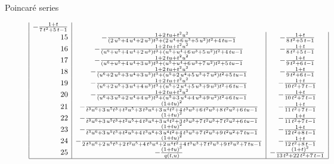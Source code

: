 \documentclass[reqno,10pt]{amsart}
\theoremstyle{definition}
\theoremstyle{remark}
\theoremstyle{plain}
\begin{document}
\begin{section}{Poincar{\'e} series}
\begin{figure}[p]
\begin{center}
\begin{displaymath}
\begin{array}{|r|c|c|}
-{\frac {1+t}{7\,{t}^{2}+5\,t-1}}
\\
15 &
-{\frac {1+2\,tu+{t}^{2}{u}^{2}}{\left (2\,{u}^{5}+4\,{u}^{4}+2\,{u}^{
3}\right ){t}^{3}+\left (2\,{u}^{4}+6\,{u}^{3}+5\,{u}^{2}\right ){t}^{
2}+4\,tu-1}}
&
-{\frac {1+t}{8\,{t}^{2}+5\,t-1}}
\\
16 &
-{\frac {1+2\,tu+{t}^{2}{u}^{2}}{\left ({u}^{6}+{u}^{5}+4\,{u}^{4}+2\,
{u}^{3}\right ){t}^{3}+\left ({u}^{5}+{u}^{4}+6\,{u}^{3}+5\,{u}^{2}
\right ){t}^{2}+4\,tu-1}}
&
-{\frac {1+t}{8\,{t}^{2}+5\,t-1}}
\\
17 &
-{\frac {1+2\,tu+{t}^{2}{u}^{2}}{\left ({u}^{6}+{u}^{5}+4\,{u}^{4}+3\,
{u}^{3}\right ){t}^{3}+\left ({u}^{5}+{u}^{4}+6\,{u}^{3}+7\,{u}^{2}
\right ){t}^{2}+5\,tu-1}}
&
-{\frac {1+t}{9\,{t}^{2}+6\,t-1}}
\\
18 &
-{\frac {1+2\,tu+{t}^{2}{u}^{2}}{\left ({u}^{6}+2\,{u}^{5}+3\,{u}^{4}+
3\,{u}^{3}\right ){t}^{3}+\left ({u}^{5}+2\,{u}^{4}+5\,{u}^{3}+7\,{u}^
{2}\right ){t}^{2}+5\,tu-1}}
&
-{\frac {1+t}{9\,{t}^{2}+6\,t-1}}
\\
19 &
-{\frac {1+2\,tu+{t}^{2}{u}^{2}}{\left ({u}^{6}+2\,{u}^{5}+3\,{u}^{4}+
4\,{u}^{3}\right ){t}^{3}+\left ({u}^{5}+2\,{u}^{4}+5\,{u}^{3}+9\,{u}^
{2}\right ){t}^{2}+6\,tu-1}}
&
-{\frac {1+t}{10\,{t}^{2}+7\,t-1}}
\\
20 &
-{\frac {1+2\,tu+{t}^{2}{u}^{2}}{\left ({u}^{6}+3\,{u}^{5}+2\,{u}^{4}+
4\,{u}^{3}\right ){t}^{3}+\left ({u}^{5}+3\,{u}^{4}+4\,{u}^{3}+9\,{u}^
{2}\right ){t}^{2}+6\,tu-1}}
&
-{\frac {1+t}{10\,{t}^{2}+7\,t-1}}
\\
21 &
-{\frac {\left (1+tu\right )^{2}}{{t}^{3}{u}^{6}+3\,{u}^{5}{t}^{3}+{t}
^{2}{u}^{5}+3\,{t}^{3}{u}^{4}+3\,{u}^{4}{t}^{2}+4\,{t}^{3}{u}^{3}+6\,{
t}^{2}{u}^{3}+8\,{t}^{2}{u}^{2}+6\,tu-1}}
&
-{\frac {1+t}{11\,{t}^{2}+7\,t-1}}
\\
22 &
-{\frac {\left (1+tu\right )^{2}}{{t}^{3}{u}^{6}+3\,{u}^{5}{t}^{3}+{t}
^{2}{u}^{5}+4\,{t}^{3}{u}^{4}+3\,{u}^{4}{t}^{2}+3\,{t}^{3}{u}^{3}+7\,{
t}^{2}{u}^{3}+7\,{t}^{2}{u}^{2}+6\,tu-1}}
&
-{\frac {1+t}{11\,{t}^{2}+7\,t-1}}
\\
23 &
-{\frac {\left (1+tu\right )^{2}}{{t}^{3}{u}^{6}+3\,{u}^{5}{t}^{3}+{t}
^{2}{u}^{5}+4\,{t}^{3}{u}^{4}+3\,{u}^{4}{t}^{2}+4\,{t}^{3}{u}^{3}+7\,{
t}^{2}{u}^{3}+9\,{t}^{2}{u}^{2}+7\,tu-1}}
&
-{\frac {1+t}{12\,{t}^{2}+8\,t-1}}
\\
24 &
-{\frac {\left (1+tu\right )^{2}}{2\,{t}^{3}{u}^{6}+2\,{u}^{5}{t}^{3}+
2\,{t}^{2}{u}^{5}+4\,{t}^{3}{u}^{4}+2\,{u}^{4}{t}^{2}+4\,{t}^{3}{u}^{3
}+7\,{t}^{2}{u}^{3}+9\,{t}^{2}{u}^{2}+7\,tu-1}}
&
-{\frac {1+t}{12\,{t}^{2}+8\,t-1}}
\\
25 &
-{\frac {\left (1+tu\right )^{3}}{q(t,u)}}
&
-{\frac {\left (1+t\right )^{2}}{13\,{t}^{3}+22\,{t}^{2}+7\,t-1}}
\\
\hline
\end{array}  
\end{displaymath}


\end{center}
\end{figure}
\end{section}
\end{document}
